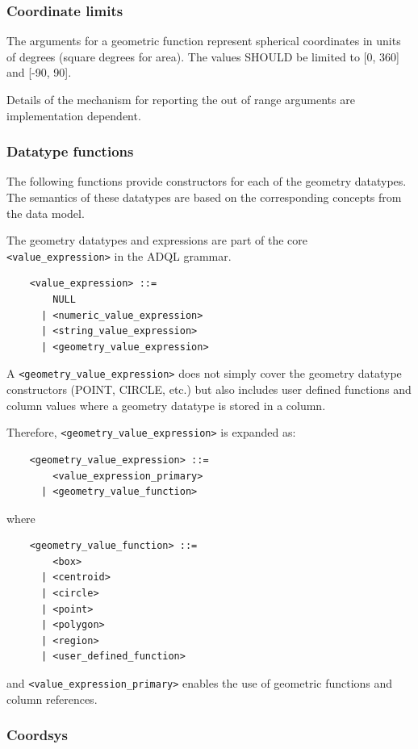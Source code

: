\documentclass[11pt,a4paper]{ivoa}
\begin{document}
\subsubsection{Coordinate limits}
\label{sec:functions.geom.limits}

The arguments for a geometric function represent spherical coordinates
in units of degrees (square degrees for area).
The values SHOULD be limited to [0, 360] and [-90, 90].
            
Details of the mechanism for reporting the out of range arguments are
implementation dependent.

\subsubsection{Datatype functions}
\label{sec:functions.geom.type}

The following functions provide constructors for each of the geometry datatypes.
The semantics of these datatypes are based on the corresponding
concepts from the \STCSpec{} data model.

The geometry datatypes and expressions are part of the core \verb:<value_expression>:
in the ADQL grammar.

\begin{verbatim}
    <value_expression> ::=
        NULL
      | <numeric_value_expression>
      | <string_value_expression>
      | <geometry_value_expression>
\end{verbatim}

A \verb:<geometry_value_expression>: does not simply cover the geometry datatype
constructors (POINT, CIRCLE, etc.) but also includes user defined functions and
column values where a geometry datatype is stored in a column.

Therefore, \verb:<geometry_value_expression>: is expanded as:
\begin{verbatim}
    <geometry_value_expression> ::= 
        <value_expression_primary>
      | <geometry_value_function>
\end{verbatim}
\noindent
where
\begin{verbatim}
    <geometry_value_function> ::=
        <box>
      | <centroid>
      | <circle>
      | <point>
      | <polygon>
      | <region>
      | <user_defined_function>
\end{verbatim}
and \verb:<value_expression_primary>: enables the use of geometric functions
and column references.

\subsubsection{Coordsys}
\label{sec:geom.coordsys.param}
\end{document}
